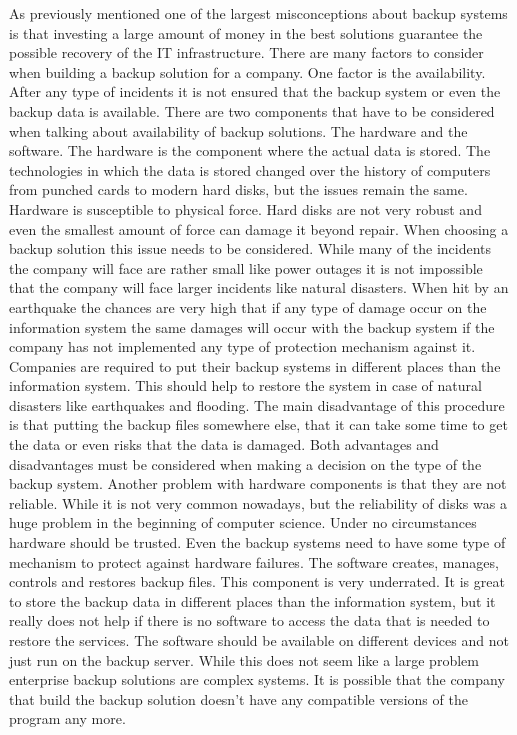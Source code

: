 \documentclass[12pt]{article}
\begin{document}
As previously mentioned one of the largest misconceptions about backup systems is that investing a large amount of money in the best solutions guarantee the possible recovery of the IT infrastructure. There are many factors to consider when building a backup solution for a company. One factor is the availability.
\newline
\newline
After any type of incidents it is not ensured that the backup system or even the backup data is available.  There are two components that have to be considered when talking about availability of backup solutions. The hardware and the software.
\newline
\newline
The hardware is the component where the actual data is stored. The technologies in which the data is stored changed over the history of computers from punched cards to modern hard disks, but the issues remain the same. Hardware is susceptible to physical force.  Hard disks are not very robust and even the smallest amount of force can damage it beyond repair. When choosing a backup solution this issue needs to be considered. While many of the incidents the company will face are rather small like power outages it is not impossible that the company will face larger incidents like natural disasters. When hit by an earthquake the chances are very high that if any type of damage occur on the information system the same damages will occur with the backup system if the company has not implemented any type of protection mechanism against it. Companies are required to put their backup systems in different places than the information system. This should help to restore the system in case of natural disasters like earthquakes and flooding. The main disadvantage of this procedure is that putting the backup files somewhere else, that it can take some time to get the data or even risks that the data is damaged. Both advantages and disadvantages must be considered when making a decision on the type of the backup system.
\newline
\newline
Another problem with hardware components is that they are not reliable. While it is not very common nowadays, but the reliability of disks was a huge problem in the  beginning of computer science. Under no circumstances hardware should be trusted. Even the backup systems need to have some type of mechanism to protect against hardware failures.
\newline
\newline
The software creates, manages, controls and restores backup files. This component is very underrated.  It is great to store the backup data in different places than the information system, but it really does not help if there is no software to access the data that is needed to restore the services. The software should be available on different devices and not just run on the backup server. While this does not seem like a large problem enterprise backup solutions are complex systems. It is possible that the company that build the backup solution doesn't have any compatible versions of the program any more.
\end{document}
